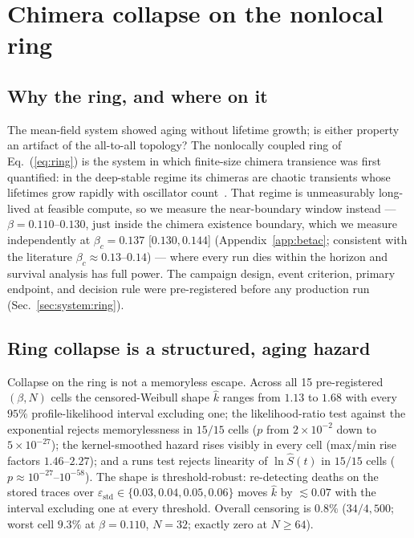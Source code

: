 \documentclass[pdflatex,sn-mathphys,Numbered]{sn-jnl}
\begin{document}
\section{Chimera collapse on the nonlocal ring}\label{sec:ring}

\subsection{Why the ring, and where on it}

The mean-field system showed aging without lifetime growth; is either property an
artifact of the all-to-all topology? The nonlocally coupled ring of
Eq.~(\ref{eq:ring}) is the system in which finite-size chimera transience was
first quantified: in the deep-stable regime its chimeras are chaotic transients
whose lifetimes grow rapidly with oscillator count~\cite{wo2011}. That regime is
unmeasurably long-lived at feasible compute, so we measure the near-boundary
window instead --- $\beta = 0.110$--$0.130$, just inside the chimera existence
boundary, which we measure independently at $\beta_c = 0.137$ [$0.130, 0.144$]
(Appendix~\ref{app:betac}; consistent with the literature
$\beta_c \approx 0.13$--$0.14$) --- where every run dies within the
horizon and survival analysis has full power. The campaign design, event
criterion, primary endpoint, and decision rule were pre-registered before any
production run (Sec.~\ref{sec:system:ring}).

\subsection{Ring collapse is a structured, aging hazard}

Collapse on the ring is not a memoryless escape. Across all 15 pre-registered
$(\beta, N)$ cells the censored-Weibull shape $\hat k$ ranges from $1.13$ to
$1.68$ with every $95\%$ profile-likelihood interval excluding one; the
likelihood-ratio test against the exponential rejects memorylessness in $15/15$
cells ($p$ from $2\times10^{-2}$ down to $5\times10^{-27}$); the kernel-smoothed
hazard rises visibly in every cell (max/min rise factors $1.46$--$2.27$); and a
runs test rejects linearity of $\ln \hat S(t)$ in $15/15$ cells
($p \approx 10^{-27}$--$10^{-58}$). The shape is threshold-robust:
re-detecting deaths on the stored traces over
$\varepsilon_{\mathrm{std}} \in \{0.03, 0.04, 0.05, 0.06\}$ moves $\hat k$ by
$\lesssim 0.07$ with the interval excluding one at every threshold. Overall
censoring is $0.8\%$ ($34/4{,}500$; worst cell $9.3\%$ at $\beta = 0.110$,
$N = 32$; exactly zero at $N \ge 64$).
\end{document}

